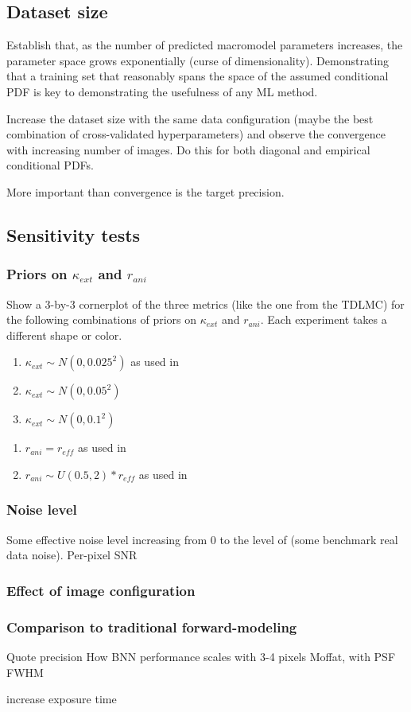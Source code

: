 \subsection{Dataset size}
Establish that, as the number of predicted macromodel parameters increases, the parameter space grows exponentially (curse of dimensionality). Demonstrating that a training set that reasonably spans the space of the assumed conditional PDF is key to demonstrating the usefulness of any ML method.

Increase the dataset size with the same data configuration (maybe the best combination of cross-validated hyperparameters) and observe the convergence with increasing number of images. Do this for both diagonal and empirical conditional PDFs.

More important than convergence is the target precision.

\subsection{Sensitivity tests}
\subsubsection{Priors on $\kappa_{ext}$ and $r_{ani}$}
Show a 3-by-3 cornerplot of the three metrics (like the one from the TDLMC) for the following combinations of priors on $\kappa_{ext}$ and $r_{ani}$. Each experiment takes a different shape or color.
\begin{enumerate}
    \item $\kappa_{ext} \sim N(0, 0.025^2)$ as used in \cite{ding2018time}
    \item $\kappa_{ext} \sim N(0, 0.05^2)$
    \item $\kappa_{ext} \sim N(0, 0.1^2)$
\end{enumerate}
\begin{enumerate}
    \item $r_{ani} = r_{eff}$ as used in \cite{ding2018time}
    \item $r_{ani} \sim U(0.5, 2)*r_{eff}$ as used in \cite{birrer2016mass}
\end{enumerate}

\subsubsection{Noise level}
Some effective noise level increasing from 0 to the level of (some benchmark real data noise). Per-pixel SNR

\subsubsection{Effect of image configuration}

\subsubsection{Comparison to traditional forward-modeling}
Quote precision
How BNN performance scales with 
3-4 pixels
Moffat, with PSF FWHM

increase exposure time